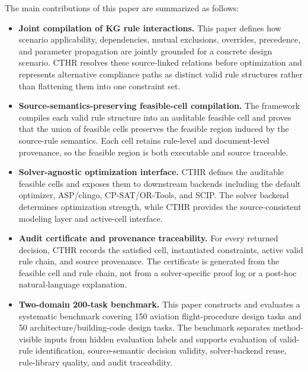 ﻿\documentclass[a4paper,fleqn]{cas-dc}
\newcommand{\CTHR}{\textsc{CTHR}}
\begin{document}
The main contributions of this paper are summarized as follows:

\begin{itemize}[leftmargin=*]
\item \textbf{Joint compilation of KG rule interactions.}
This paper defines how scenario applicability, dependencies, mutual exclusions,
overrides, precedence, and parameter propagation are jointly grounded for a
concrete design scenario. \CTHR{} resolves these source-linked relations before
optimization and represents alternative compliance paths as distinct valid rule
structures rather than flattening them into one constraint set.

\item \textbf{Source-semantics-preserving feasible-cell compilation.}
The framework compiles each valid rule structure into an auditable feasible cell and proves
that the union of feasible cells preserves the feasible region induced by the
source-rule semantics. Each cell retains rule-level and document-level
provenance, so the feasible region is both executable and source traceable.

\item \textbf{Solver-agnostic optimization interface.}
\CTHR{} defines the auditable feasible cells and exposes them to downstream
backends including the default optimizer, ASP/clingo, CP-SAT/OR-Tools, and
SCIP. The solver backend determines optimization strength, while \CTHR{}
provides the source-consistent modeling layer and active-cell interface.

\item \textbf{Audit certificate and provenance traceability.}
For every returned decision, \CTHR{} records the satisfied cell, instantiated
constraints, active valid rule chain, and source provenance. The certificate is
generated from the feasible cell and rule chain, not from a solver-specific
proof log or a post-hoc natural-language explanation.

\item \textbf{Two-domain 200-task benchmark.}
This paper constructs and evaluates a systematic benchmark covering 150 aviation
flight-procedure design tasks and 50 architecture/building-code design tasks.
The benchmark separates method-visible inputs from hidden evaluation labels and
supports evaluation of valid-rule identification, source-semantic decision
validity, solver-backend reuse, rule-library quality, and audit traceability.
\end{itemize}

\end{document}
